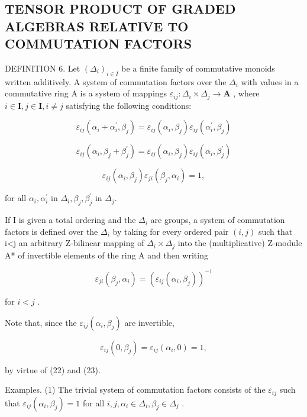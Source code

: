 \subsection{TENSOR PRODUCT OF GRADED ALGEBRAS RELATIVE TO COMMUTATION FACTORS}

DEFINITION 6. Let \((\Delta_{i})_{i\in I}\) be a finite family of commutative monoids written additively. A system of commutation factors over the \(\Delta_{i}\) with values in a commutative ring A is a system of mappings \(\varepsilon_{ij}:\Delta_i\times \Delta_j\to \mathbf{A}\) , where \(i\in \mathbf{I}, j\in \mathbf{I}, i\neq j\) satisfying the following conditions:

\[
\varepsilon_ {i j} \left(\alpha_ {i} + \alpha_ {i} ^ {\prime}, \beta_ {j}\right) = \varepsilon_ {i j} \left(\alpha_ {i}, \beta_ {j}\right) \varepsilon_ {i j} \left(\alpha_ {i} ^ {\prime}, \beta_ {j}\right)\tag{22}
\]

\[
\varepsilon_ {i j} \left(\alpha_ {i}, \beta_ {j} + \beta_ {j} ^ {\prime}\right) = \varepsilon_ {i j} \left(\alpha_ {i}, \beta_ {j}\right) \varepsilon_ {i j} \left(\alpha_ {i}, \beta_ {j} ^ {\prime}\right)\tag{23}
\]

\[
\varepsilon_ {i j} (\alpha_ {i}, \beta_ {j}) \varepsilon_ {j i} (\beta_ {j}, \alpha_ {i}) = 1,\tag{24}
\]

for all \(\alpha_{i},\alpha_{i}^{\prime}\) in \(\Delta_{i},\beta_{j},\beta_{j}^{\prime}\) in \(\Delta_j\).

If I is given a total ordering and the \(\Delta_{i}\) are groups, a system of commutation factors is defined over the \(\Delta_{i}\) by taking for every ordered pair \((i,j)\) such that i\textless j an arbitrary Z-bilinear mapping of \(\Delta_{i}\times\Delta_{j}\) into the (multiplicative) Z-module A* of invertible elements of the ring A and then writing

\[
\varepsilon_ {j i} (\beta_ {j}, \alpha_ {i}) = (\varepsilon_ {i j} (\alpha_ {i}, \beta_ {j})) ^ {- 1}
\]

for \(i < j\) .

Note that, since the \(\varepsilon_{ij}(\alpha_{i},\beta_{j})\) are invertible,

\[
\varepsilon_ {i j} (0, \beta_ {j}) = \varepsilon_ {i j} (\alpha_ {i}, 0) = 1,
\]

by virtue of (22) and (23).

Examples. (1) The trivial system of commutation factors consists of the \(\varepsilon_{ij}\) such that \(\varepsilon_{ij}(\alpha_i, \beta_j) = 1\) for all \(i, j, \alpha_i \in \Delta_i, \beta_j \in \Delta_j\) .

